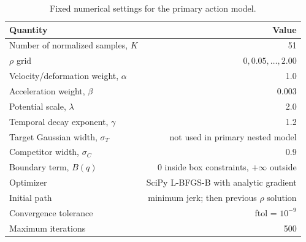 \begin{table}[htbp]
\centering
\caption{Fixed numerical settings for the primary action model.}
\label{tab:numerical-settings}
\begin{tabular}{l r}
\toprule
Quantity & Value \\
\midrule
Number of normalized samples, $K$ & 51 \\
$\rho$ grid & $0,0.05,\ldots,2.00$ \\
Velocity/deformation weight, $\alpha$ & 1.0 \\
Acceleration weight, $\beta$ & 0.003 \\
Potential scale, $\lambda$ & 2.0 \\
Temporal decay exponent, $\gamma$ & 1.2 \\
Target Gaussian width, $\sigma_T$ & not used in primary nested model \\
Competitor width, $\sigma_C$ & 0.9 \\
Boundary term, $B(q)$ & 0 inside box constraints, $+\infty$ outside \\
Optimizer & SciPy L-BFGS-B with analytic gradient \\
Initial path & minimum jerk; then previous $\rho$ solution \\
Convergence tolerance & ftol = $10^{-9}$ \\
Maximum iterations & 500 \\
\bottomrule
\end{tabular}
\end{table}
